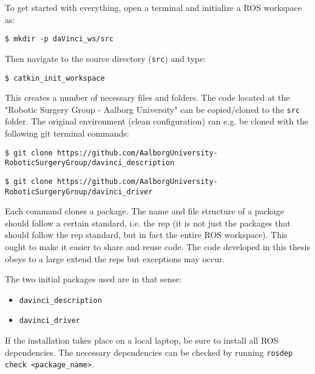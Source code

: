 To get started with everything, open a terminal and initialize a ROS workspace as:

\hspace{1cm} \texttt{\$ mkdir -p daVinci\_ws/src}

Then navigate to the source directory (\texttt{src}) and type:

\hspace{1cm} \texttt{\$ catkin\_init\_workspace}

This creates a number of necessary files and folders. The code located at the "Robotic Surgery Group - Aalborg University" can be copied/cloned to the \texttt{src} folder. %
The original environment (clean configuration) can e.g. be cloned with the following git terminal commands:\vspace{0.1cm}

\hspace{0cm} \texttt{\$ git clone https://github.com/AalborgUniversity-RoboticSurgeryGroup/davinci\_description}

\hspace{0cm} \texttt{\$ git clone https://github.com/AalborgUniversity-RoboticSurgeryGroup/davinci\_driver}


Each command clones a package. The name and file structure of a package should follow a certain standard, i.e. the \gls{rep} (it is not just the packages that should follow the \gls{rep} standard, but in fact the entire ROS workspace). This ought to make it easier to share and reuse code. The code developed in this thesis obeys to a large extend the \gls{rep}s but exceptions may occur. 

The two initial packages used are in that sense:
\begin{itemize}
\item \texttt{davinci\_description}
\item \texttt{davinci\_driver}
\end{itemize}
If the installation takes place on a local laptop, be sure to install all ROS dependencies. The necessary dependencies can be checked by running \texttt{rosdep check <package\_name>}.

